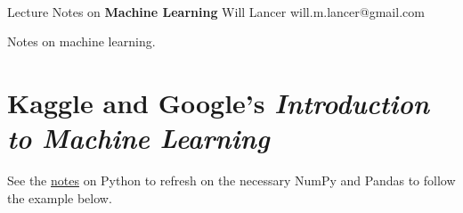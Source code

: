 \documentclass[11pt]{article}
\begin{document}
\thispagestyle{empty}
\bigskip \
\vspace{0.1cm}

\begin{center}
{\fontsize{22}{22} \selectfont Lecture Notes on}
\vskip 16pt
{\fontsize{36}{36} \selectfont \bf \sffamily Machine Learning}
\vskip 24pt
{\fontsize{18}{18} \selectfont \rmfamily Will Lancer} 
\vskip 6pt
{\fontsize{14}{14} \selectfont \ttfamily will.m.lancer@gmail.com} 
\vskip 24pt
\end{center}

{\parindent0pt \baselineskip=15.5pt}
\noin
Notes on machine learning.

\newpage
\microtoc
\newpage

\section{Kaggle and Google's \emph{Introduction to Machine Learning}}

See the \href{https://github.com/will-lancer/notes/Computer_Science/Python/Python.pdf}{notes} 
on Python to refresh on the necessary NumPy and Pandas
to follow the example below.
\end{document}
